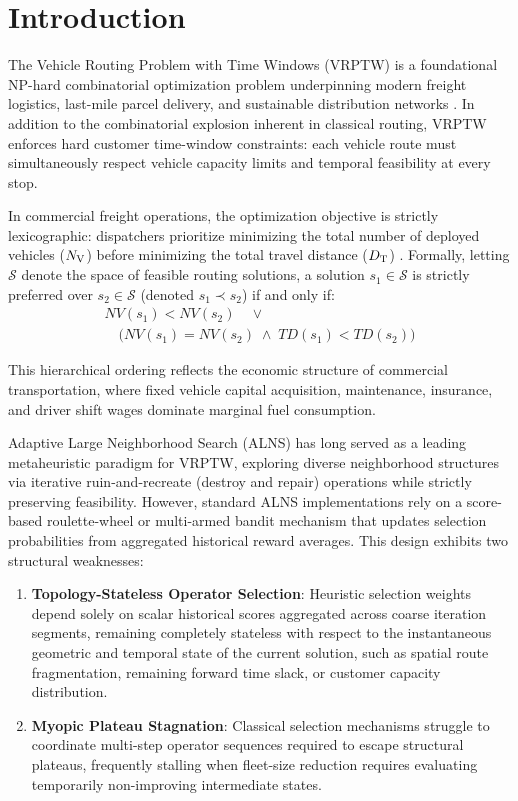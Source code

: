 \section{Introduction}
\label{sec:introduction}

The Vehicle Routing Problem with Time Windows (VRPTW) is a foundational NP-hard combinatorial optimization problem underpinning modern freight logistics, last-mile parcel delivery, and sustainable distribution networks \cite{Dantzig1959, Solomon1987}. In addition to the combinatorial explosion inherent in classical routing, VRPTW enforces hard customer time-window constraints: each vehicle route must simultaneously respect vehicle capacity limits and temporal feasibility at every stop.

In commercial freight operations, the optimization objective is strictly lexicographic: dispatchers prioritize minimizing the total number of deployed vehicles (${N_\mathrm{V}}$) before minimizing the total travel distance (${D_\mathrm{T}}$) \cite{Toth2014, braysy2005vehicle}. Formally, letting $\mathcal{S}$ denote the space of feasible routing solutions, a solution $s_1 \in \mathcal{S}$ is strictly preferred over $s_2 \in \mathcal{S}$ (denoted $s_1 \prec s_2$) if and only if:
\begin{multline}
  NV(s_1) < NV(s_2) \quad \lor \\
  \quad \big(NV(s_1) = NV(s_2) \;\land\; TD(s_1) < TD(s_2)\big)
  \label{eq:lexicographic_intro}
\end{multline}

This hierarchical ordering reflects the economic structure of commercial transportation, where fixed vehicle capital acquisition, maintenance, insurance, and driver shift wages dominate marginal fuel consumption.

Adaptive Large Neighborhood Search (ALNS) \cite{Ropke2006, pisinger2007general} has long served as a leading metaheuristic paradigm for VRPTW, exploring diverse neighborhood structures via iterative ruin-and-recreate (destroy and repair) operations while strictly preserving feasibility. However, standard ALNS implementations rely on a score-based roulette-wheel or multi-armed bandit mechanism that updates selection probabilities from aggregated historical reward averages. This design exhibits two structural weaknesses:
\begin{enumerate}
    \item \textbf{Topology-Stateless Operator Selection}: Heuristic selection weights depend solely on scalar historical scores aggregated across coarse iteration segments, remaining completely stateless with respect to the instantaneous geometric and temporal state of the current solution, such as spatial route fragmentation, remaining forward time slack, or customer capacity distribution.
    \item \textbf{Myopic Plateau Stagnation}: Classical selection mechanisms struggle to coordinate multi-step operator sequences required to escape structural plateaus, frequently stalling when fleet-size reduction requires evaluating temporarily non-improving intermediate states.
\end{enumerate}

